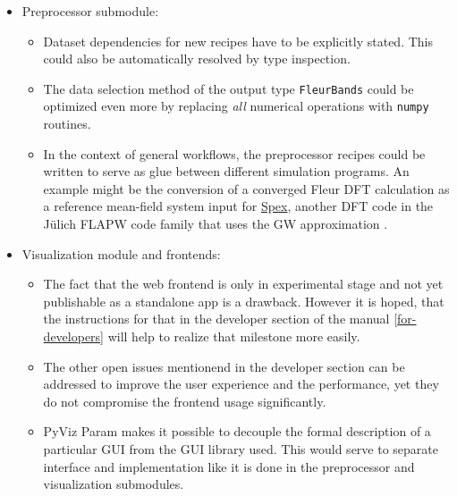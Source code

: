 \begin{itemize}
\item Preprocessor submodule:
    \begin{itemize}
    \item Dataset dependencies for new recipes have to be explicitly stated.
        This could also be automatically resolved by type inspection.
    \item The data selection method of the output type \texttt{FleurBands} could
        be optimized even more by replacing \textit{all} numerical operations
        with \texttt{numpy} routines.
    \item In the context of general workflows, the preprocessor recipes could be
        written to serve as glue between different simulation programs. An
        example might be the conversion of a converged Fleur DFT calculation as
        a reference mean-field system input for
        \href{https://spex.readthedocs.io/en/master/spex_and_fleur.html#old-fleur}{Spex},
        another DFT code in the Jülich FLAPW code family that uses the GW
        approximation \cite{fleur-spex}.
    \end{itemize}
\item Visualization module and frontends:
    \begin{itemize}
    \item The fact that the web frontend is only in experimental stage and not
        yet publishable as a standalone app is a drawback. However it is hoped,
        that the instructions for that in the developer section of the manual
        \vref{for-developers} will help to realize that milestone more easily. 
    \item The other open issues mentionend in the developer section can be addressed to improve the user
        experience and the performance, yet they do not compromise the frontend
        usage significantly.
    \item PyViz Param \cite{pyviz-param} makes it possible to decouple the
        formal description of a particular GUI from the GUI library used. This
        would serve to separate interface and implementation like it is done in
        the preprocessor and visualization submodules.
    \end{itemize}
\end{itemize}


